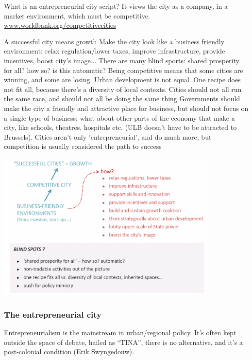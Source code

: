\documentclass{article}
\begin{document}
What is an entrepreneurial city script? It views the city as a company, in a market environment, which must be competitive.
\url{www.worldbank.org/competitivecities}

\begin{outline}
	\1 A successful city means growth
	\1 Make the city look like a business friendly environment: relax regulation/lower taxes, improve infrastructure, provide incentives, boost city's image...
	\1 There are many blind sports: shared prosperity for all? how so? is this automatic? Being competitive means that some cities are winning, and some are losing. Urban development is not equal. 
	\1 One recipe does not fit all, because there's a diversity of local contexts. Cities should not all run the same race, and should not all be doing the same thing
	\1 Governments should make the city a friendly and attractive place for business, but should not focus on a single type of business; what about other parts of the economy that make a city, like schools, theatres, hospitals etc. (ULB doesn't have to be attracted to Brussels).
Cities aren't only 'entrepreneurial', and do much more, but competition is usually considered the path to success
\end{outline}

\begin{center}
\includegraphics[width=30em]{entrepreneurial_script}
\end{center}

\subsubsection{The entrepreneurial city}

Entrepreneurialism is the mainstream in urban/regional policy. It's often kept outside the space of debate, hailed as ``TINA'',  there is no alternative, and it's a post-colonial condition (Erik Swyngedouw).
\end{document}
